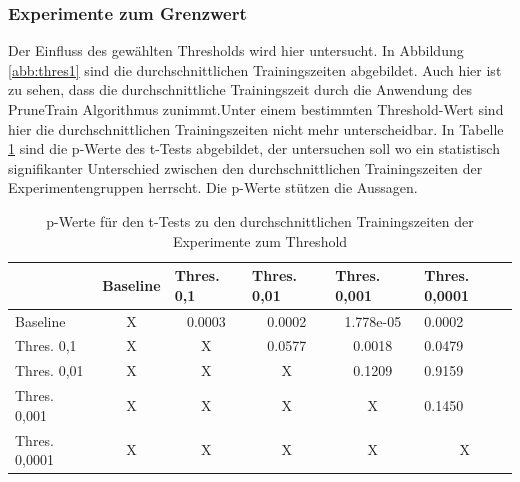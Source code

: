 \subsubsection{Experimente zum Grenzwert}

Der Einfluss des gewählten Thresholds wird hier untersucht. In Abbildung \ref{abb:thres1} sind die durchschnittlichen Trainingszeiten abgebildet. Auch hier ist zu sehen, dass die durchschnittliche Trainingszeit durch die Anwendung des PruneTrain Algorithmus zunimmt.Unter einem bestimmten Threshold-Wert sind hier die durchschnittlichen Trainingszeiten nicht mehr unterscheidbar. In Tabelle \ref{tab:thres1} sind die p-Werte des t-Tests abgebildet, der untersuchen soll wo ein statistisch signifikanter Unterschied zwischen den durchschnittlichen Trainingszeiten der Experimentengruppen herrscht. Die p-Werte stützen die Aussagen.

\begin{table}[]
\caption{p-Werte für den t-Tests zu den durchschnittlichen Trainingszeiten der Experimente zum Threshold}
\begin{tabular}{l|c|c|c|c|l|}
\cline{2-6}
                                       & \multicolumn{1}{l|}{Baseline} & \multicolumn{1}{l|}{Thres. 0,1} & \multicolumn{1}{l|}{Thres. 0,01} & \multicolumn{1}{l|}{Thres. 0,001} & Thres. 0,0001               \\ \hline
\multicolumn{1}{|l|}{Baseline}         & X                             & 0.0003                             & 0.0002                              & 1.778e-05                            & 0.0002                         \\ \hline
\multicolumn{1}{|l|}{Thres. 0,1}    & X                             & X                                  & \cellcolor[HTML]{FE0000}0.0577      & 0.0018                               & 0.0479                         \\ \hline
\multicolumn{1}{|l|}{Thres. 0,01}   & X                             & X                                  & X                                   & \cellcolor[HTML]{FE0000}0.1209       & \cellcolor[HTML]{FE0000}0.9159 \\ \hline
\multicolumn{1}{|l|}{Thres. 0,001}  & X                             & X                                  & X                                   & X                                    & \cellcolor[HTML]{FE0000}0.1450 \\ \hline
\multicolumn{1}{|l|}{Thres. 0,0001} & X                             & X                                  & X                                   & X                                    & \multicolumn{1}{c|}{X}         \\ \hline
\end{tabular}
\label{tab:thres1}
\end{table}


